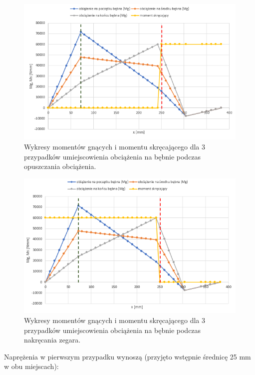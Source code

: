         	\begin{figure}[th]
        		\centering
        		\includegraphics[width=0.9\linewidth]{Projekt/momenty_gnace_skrecajace_rozwijanie}
        		\caption{Wykresy momentów gnących i momentu skręcającego dla 3 przypadków umiejscowienia obciążenia na bębnie podczas opuszczania obciążenia.} 
        		\label{fig::momenty_gnace_rozwijanie}
        	\end{figure}
        
	        \begin{figure}[th]
	        	\centering
	        	\includegraphics[width=0.9\linewidth]{Projekt/momenty_gnace_skrecajace_nawijanie}
	        	\caption{Wykresy momentów gnących i momentu skręcającego dla 3 przypadków umiejscowienia obciążenia na bębnie  podczas nakręcania zegara.} 
	        	\label{fig::momenty_gnace_nawijanie}
	        \end{figure}
        
        	Naprężenia w pierwszym przypadku wynoszą (przyjęto wstępnie średnicę 25 mm w obu miejscach):
        	
